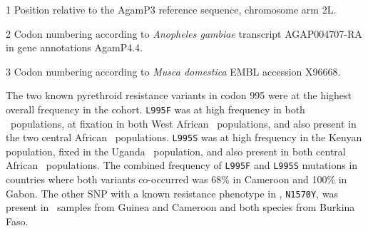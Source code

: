 \begin{refsection}
{\begin{landscape}
\begin{table}[h]
\begin{threeparttable}
  \label{table:snps}

  

  \begin{tablenotes}
    \footnotesize

    \item[1] Position relative to the AgamP3 reference sequence, chromosome arm 2L.

    \item[2] Codon numbering according to \emph{Anopheles gambiae} transcript AGAP004707-RA in gene annotations AgamP4.4.

    \item[3] Codon numbering according to \emph{Musca domestica} EMBL accession X96668.

  \end{tablenotes}

  \end{threeparttable}

\end{table}
\end{landscape}
\restoregeometry
} %


The two known pyrethroid resistance variants in codon 995 were at the highest overall frequency in the cohort.
%
\texttt{L995F} was at high frequency in both \acol\ populations, at fixation in both West African \agam\ populations, and also present in the two central African \agam\ populations.
%
\texttt{L995S} was at high frequency in the Kenyan population, fixed in the Uganda \agam\ population, and also present in both central African \agam\ populations.
%
The combined frequency of \texttt{L995F} and \texttt{L995S} mutations in countries where both variants co-occurred was 68\% in Cameroon and 100\% in Gabon.
%
The other SNP with a known resistance phenotype in \agam, \texttt{N1570Y}, was present in \agam\ samples from Guinea and Cameroon and both species from Burkina Faso.



\end{refsection}
